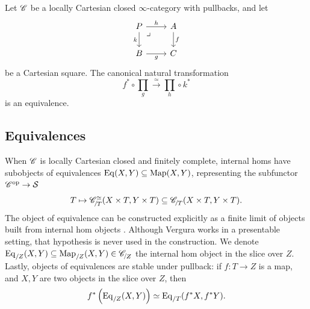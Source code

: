 \documentclass[twoside,a4paper,11pt]{amsart}
\begin{document}
\begin{lemma}
    Let $\mathscr{C}$ be a locally Cartesian closed $\infty$-category with pullbacks, and let 
\[\begin{tikzcd}
	P \arrow[r, "h"]\arrow[dr, phantom, "\lrcorner"{anchor=center, pos=0.125}] \arrow[d, "k"'] & A \arrow[d, "f"] \\
	B \arrow[r, "g"'] & C
\end{tikzcd}\]
be a Cartesian square. The canonical natural transformation \[f^\ast\circ \prod_g\xrightarrow[]{\simeq}\prod_h\circ k^\ast\]
is an equivalence.
\end{lemma}

\subsection{Equivalences}\label{subsection: equivalences}
 When $\mathscr{C}$ is locally Cartesian closed and finitely complete, internal homs have subobjects of equivalences $\mathrm{Eq}(X,Y)\subseteq \mathrm{Map}(X,Y)$, representing the subfunctor $\mathscr{C}^{\mathrm{op}}\to\mathcal{S}$
\[T \mapsto \slice{\C}{T}^\simeq(X\times T,Y\times T)\subseteq \slice{\C}{T}(X\times T, Y\times T).\] 
The object of equivalence can be constructed explicitly as a finite limit of objects built from internal hom objects \cite[Lemma 2.8]{Vergura_LocalizationInTopos}. Although Vergura works in a presentable setting, that hypothesis is never used in the construction. We denote $\Eq_{/Z}(X,Y)\subseteq\Map_{/Z}(X,Y)\in\slice{\C}{Z}$ the internal hom object in the slice over $Z$. Lastly, objects of equivalences are stable under pullback: if $f\colon T\to Z$ is a map, and $X,Y$ are two objects in the slice over $Z$, then 
\begin{equation}\label{eq: object of equivalences is stable under pullback}
    f^\ast\left(\mathrm{Eq}_{/Z}(X,Y)\right)\simeq \mathrm{Eq}_{/T}(f^\ast X,f^\ast Y).
\end{equation}
\end{document}
